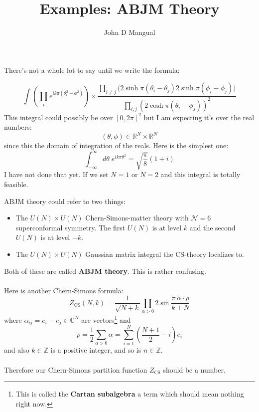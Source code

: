 \documentclass[12pt]{article}
\title{\textbf{ Examples:  ABJM Theory }}
\author{John D Mangual}
\date{}
\begin{document}
\selectfont \fontsize{25}{30}\selectfont

\maketitle

\noindent There's not a whole lot to say until we write the formula:

$$ \int \left( \prod_i e^{ik\pi (\theta_i^2 - \phi^2)} \right) \times \frac{\prod_{i \neq j}\big(2 \sinh \pi (\theta_i - \theta_j) 2 \sinh \pi (\phi_i - \phi_j)\big)}{\prod_{i,j}(2 \cosh \pi (\theta_i - \phi_j))^2} $$
This integral could possibly be over $[0, 2\pi]^2$ but I am expecting it's over the real numbers:
$$ (\theta, \phi) \in \mathbb{R}^N \times \mathbb{R}^N$$
since this the domain of integration of the reals.  Here is the simplest one:
$$ \int_{-\infty}^\infty d\theta \; e^{i k \pi \theta^2} = \sqrt{\frac{\pi}{8}} (1+i)$$
I have not done that yet.  If we set $N=1$ or $N=2$ and this integral is totally feasible.

\newpage

\noindent ABJM theory could refer to two things:
\begin{itemize}
\item The $U(N) \times U(N)$ Chern-Simons-matter theory with $\mathcal{N}=6$ superconformal symmetry.  The first $U(N)$ is at level $k$ and the second $U(N)$ is at level $-k$.
\item The $U(N) \times U(N)$ Gaussian matrix integral the CS-theory localizes to.  
\end{itemize}
Both of these are called \textbf{ABJM theory}.  This is rather confusing. \\ \\
Here is another Chern-Simons formula:
$$ Z_\text{CS} (N, k) = \frac{1}{\sqrt{N+k}} \prod_{\alpha > 0} 2 \sin \frac{\pi \,\alpha \cdot \rho}{k+N} $$
where $\alpha_{ij} = e_i - e_j \in \mathbb{C}^N$ are vectors\footnote{This is called the \textbf{Cartan subalgebra} a term which should mean nothing right now.} and 
$$ \rho = \frac{1}{2} \sum_{\alpha > 0} \alpha = \sum_{i=1}^N \left(\frac{N+1}{2} - i \right) e_i $$
and also $k \in \mathbb{Z}$ is a positive integer, and so is $n \in \mathbb{Z}$. \\ \\
Therefore our Chern-Simons partition function $Z_\text{CS}$ should be a number.

\newpage
\end{document}
